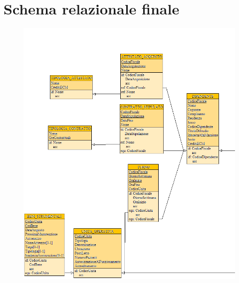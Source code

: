 \documentclass[a4paper, 12pt]{report}
\begin{document}
\section{Schema relazionale finale}
\begin{figure}[H]
        \centering
        \includegraphics[width=1.0\textwidth]{img/schemaRelazionaleSX.png}
\end{figure}
\end{document}

